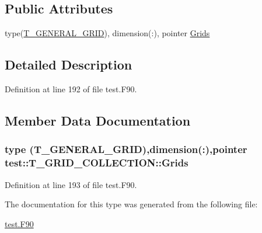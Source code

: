 \subsection*{Public Attributes}
\begin{DoxyCompactItemize}
\item 
type(\hyperlink{typetest_1_1_t___g_e_n_e_r_a_l___g_r_i_d}{T\_\-GENERAL\_\-GRID}), dimension(:), pointer \hyperlink{typetest_1_1_t___g_r_i_d___c_o_l_l_e_c_t_i_o_n_a0adf7c407bee68fc0c3a5ee65c35ad4f}{Grids}
\end{DoxyCompactItemize}


\subsection{Detailed Description}


Definition at line 192 of file test.F90.



\subsection{Member Data Documentation}
\hypertarget{typetest_1_1_t___g_r_i_d___c_o_l_l_e_c_t_i_o_n_a0adf7c407bee68fc0c3a5ee65c35ad4f}{
\subsubsection[{Grids}]{\setlength{\rightskip}{0pt plus 5cm}type ({\bf T\_\-GENERAL\_\-GRID}),dimension(:),pointer {\bf test::T\_\-GRID\_\-COLLECTION::Grids}}}
\label{typetest_1_1_t___g_r_i_d___c_o_l_l_e_c_t_i_o_n_a0adf7c407bee68fc0c3a5ee65c35ad4f}


Definition at line 193 of file test.F90.



The documentation for this type was generated from the following file:\begin{DoxyCompactItemize}
\item 
\hyperlink{test_8_f90}{test.F90}\end{DoxyCompactItemize}
